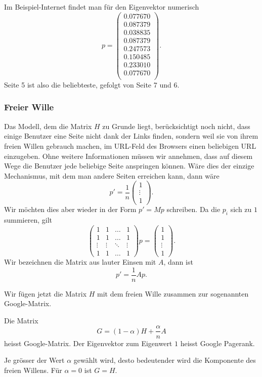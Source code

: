 Im Beispiel-Internet findet man für den Eigenvektor numerisch
\[
p=
\begin{pmatrix}
   0.077670\\
   0.087379\\
   0.038835\\
   0.087379\\
   0.247573\\
   0.150485\\
   0.233010\\
   0.077670\\
\end{pmatrix}.
\]
Seite  5 ist also die beliebteste, gefolgt von Seite 7 und 6.

\subsubsection{Freier Wille}
Das Modell, dem die Matrix $H$ zu Grunde liegt, berücksichtigt
noch nicht, dass einige Benutzer eine Seite nicht dank der Links
finden, sondern weil sie von ihrem freien Willen gebrauch machen,
im URL-Feld des Browsers einen beliebigen URL einzugeben.
Ohne weitere Informationen müssen wir annehmen, dass auf diesem
Wege die Benutzer jede beliebige Seite anspringen können.
Wäre dies der einzige Mechanismus, mit dem man andere Seiten erreichen
kann, dann wäre
\[
p'=\frac1n\begin{pmatrix}
1\\\vdots\\1
\end{pmatrix}.
\]
Wir möchten dies aber wieder in der Form $p'=Mp$ schreiben.
Da die $p_i$ sich zu $1$ summieren, gilt
\[
\begin{pmatrix}
     1&     1&\dots &     1\\
     1&     1&\dots &     1\\
\vdots&\vdots&\ddots&\vdots\\
     1&     1&\dots &     1
\end{pmatrix}
p=\begin{pmatrix}1\\1\\\vdots\\1\end{pmatrix}.
\]
Wir bezeichnen die Matrix aus lauter Einsen mit $A$, dann ist
\[
p'=\frac{1}{n}Ap.
\]

Wir fügen jetzt die Matrix $H$ mit dem freien Wille zusammen zur 
sogenannten Google-Matrix.
\begin{definition}
Die Matrix 
\[
G=(1-\alpha)H+\frac{\alpha}nA
\]
heisst Google-Matrix.
Der Eigenvektor zum Eigenwert $1$ heisst Google Pagerank.
\end{definition}
Je grösser der Wert $\alpha$ gewählt wird, desto bedeutender wird die
Komponente des freien Willens. Für $\alpha=0$ ist $G=H$.

